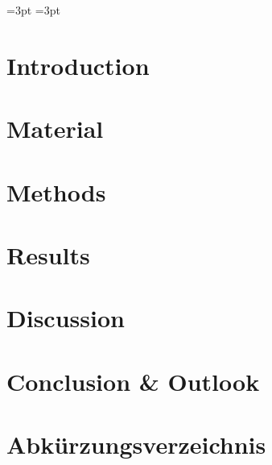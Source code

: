 \documentclass[english, version-2019-07]{uzl-thesis}
\begin{document}
=3pt
=3pt





\chapter{Introduction}



\chapter{Material}



\chapter{Methods}



\chapter{Results}



\chapter{Discussion}



\chapter{Conclusion \& Outlook}




\chapter*{Abkürzungsverzeichnis}



\printbibliography
\end{document}

